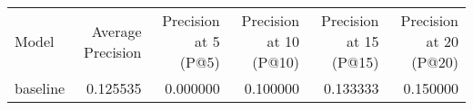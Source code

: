 \begin{tabular}{lrrrrr}
Model & Average Precision & Precision at 5 (P@5) & Precision at 10 (P@10) & Precision at 15 (P@15) & Precision at 20 (P@20) \\
baseline & 0.125535 & 0.000000 & 0.100000 & 0.133333 & 0.150000 \\
\end{tabular}
